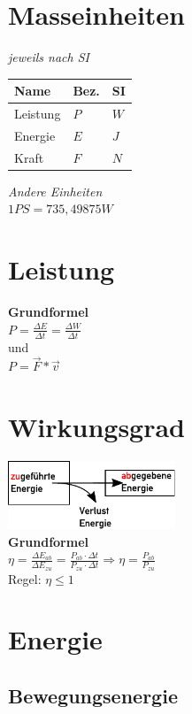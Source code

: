 \documentclass[a4paper,10pt]{article}
\begin{document}
\begin{multicols}{2}

  \section{Masseinheiten}
  \textit{jeweils nach SI}\\
  \begin{tabular}{|l|l|l|}
    \hline
    \textbf{Name} & \textbf{Bez.} & \textbf{SI} \\\hline
    Leistung & \(P\) & \(W\)\\\hline
    Energie & \(E\) & \(J\) \\\hline
    Kraft & \(F\) & \(N\)\\\hline
  \end{tabular}

  \textit{Andere Einheiten}\\
  \(1 PS = 735,49875 W\)\\


  \section{Leistung}
  \textbf{Grundformel}\\
  \(P = \frac{\Delta E}{\Delta t} = \frac{\Delta W}{\Delta t} \)\\
  und\\
  \(P = \vec{F} * \vec{v}\)

  \section{Wirkungsgrad}
  \includegraphics[width=5cm]{wirkungsgrad}\\
  \textbf{Grundformel}\\
  \(\eta = \frac{{\Delta {E_{ab}}}}{{\Delta {E_{zu}}}} = \frac{{{P_{ab}} \cdot \Delta t}}{{{P_{zu}} \cdot \Delta t}} \Rightarrow \eta = \frac{{{P_{ab}}}}{{{P_{zu}}}}\)
  \\
  Regel: \(\eta \leq 1\)
  \section{Energie}
  \subsection{Bewegungsenergie}


\end{multicols}
\end{document}
